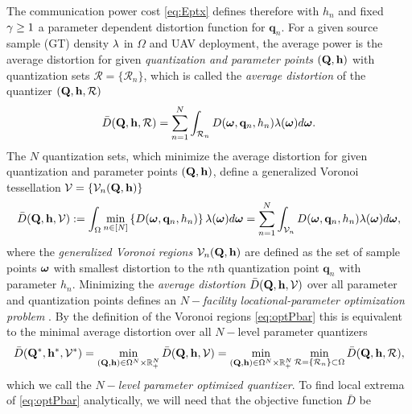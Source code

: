 \documentclass[12pt,onecolumn,final,letterpaper]{IEEEtran}
\renewcommand{\vp}{\mathbf q}
\renewcommand{\vP}{\mathbf Q}
\newcommand{\df}{\ensuremath{\lam}}         %
\newcommand{\bH}{\ensuremath{\vh}}          %
\newcommand{\Vor}{\ensuremath{\mathcal{V}}}         %
\newcommand{\Rset}{\ensuremath{\mathcal R}}
\newcommand{\Dis}{\ensuremath{D}}                    %
\newcommand{\AvDis}{\ensuremath{\bar{\Dis}}}         %
\begin{document}
The communication power cost \eqref{eq:Eptx} defines therefore with $h_n$ and fixed $\gamma\geq 1$ a parameter dependent
distortion function for $\vp_n$. For a given source sample (GT) density $\df$ in $\Omega$ and UAV deployment, the
average power is the average distortion for given \emph{quantization and parameter points} $(\vP,\vh)$ with quantization
sets $\Rset=\{\Rset_n\}$, which is called the \emph{average distortion} of the quantizer $(\vP,\vh,\Rset)$
%
\begin{equation}
 \AvDis(\vP,\vh,\Rset)
  = \sum_{n=1}^N \int_{\Rset_n} D(\vome,\vp_n,h_n)\lam(\vome)d\vome.
  \label{eq:Pbar}
\end{equation}
%
The $N$ quantization sets, which minimize the average distortion for 
given quantization and parameter points $(\vP,\vh)$, define a generalized Voronoi tessellation $\Vor=\{\Vor_n(\vP,\vh)\}$
%
\begin{align}
  \AvDis(\vP,\vh,\Vor)
  :=\int_{\Omega}\min_{n\in[N]} \left\{ \Dis(\vome,\vp_n,h_n) \right\} \df(\vome)d\vome 
  =\sum_{n=1}^N\int_{\Vor_n}\Dis(\vome,\vp_n,h_n) \df(\vome)d\vome 
  \label{eq:optPbar},
\end{align}
%
where the \emph{generalized Voronoi regions} $\Vor_n(\vP,\vh)$ are defined as the set of sample points $\boldsymbol{ \omega}$ with
smallest distortion to the $n$th quantization point $\vp_n$ with parameter $h_n$.  Minimizing the
\emph{average distortion} $\AvDis(\vP,\vh,\Vor)$ over all parameter and quantization points defines an
\emph{$N-$facility locational-parameter optimization problem} \cite{GJ, GJcom18, GJ18,OBSC00}. By the definition of the
Voronoi regions \eqref{eq:optPbar} this is equivalent to the minimal average distortion over all $N-$level parameter
quantizers%
%
\begin{align}
  \AvDis(\vP^*,\vh^*,\Vor^*)
  = \min_{(\vP,\vh)\in\Ome^N\times\R_+^N} \AvDis(\vP,\vh,\Vor)
  = \min_{(\vP,\vh)\in\Ome^N\times\R_+^N} \min_{\Rset=\{\Rset_n\}\subset\Ome} \AvDis(\vP,\vh,\Rset), 
\label{eq:optquanteqoptdeploy}
\end{align}
%
which we call the \emph{$N-$level parameter optimized quantizer}.
%
%
%
To find local extrema of \eqref{eq:optPbar} analytically, we will need that the objective function $\AvDis$ be
\end{document}
